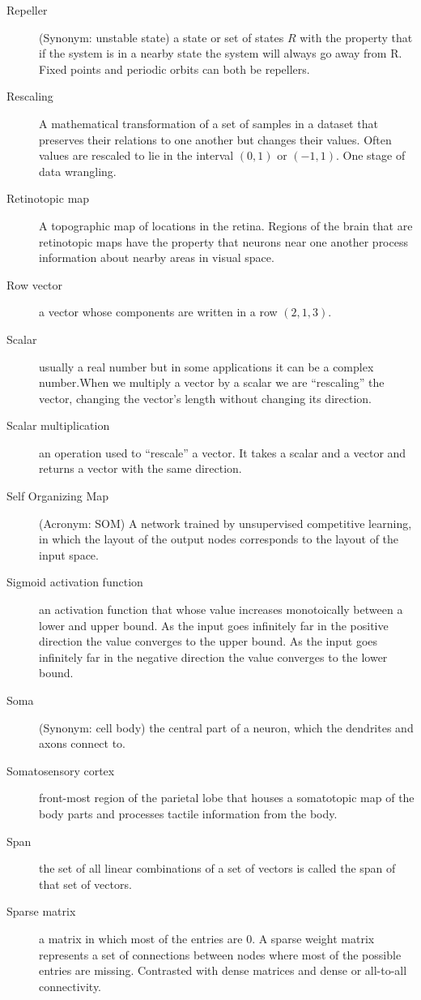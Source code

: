 \begin{description}
\item[Repeller] (Synonym: unstable state) a state or set of states $R$ with the property that if the system is in a nearby state the system will always go away from R. Fixed points and periodic orbits can both be repellers.
\item[Rescaling] A mathematical transformation of a set of samples in a dataset that preserves their relations to one another but changes their values. Often values are rescaled to lie in the interval $(0,1)$ or $(-1,1)$. One stage of data wrangling.
\item[Retinotopic map] A topographic map of locations in the retina. Regions of the brain that are retinotopic maps have the property that neurons near one another process information about nearby areas in visual space.
\item[Row vector] a vector whose components are written in a row \eg $(2,1,3)$.
\item[Scalar] usually a real number but in some applications it can be a complex number.When we multiply a vector by a scalar we are ``rescaling'' the vector, \ie changing the vector's length without changing its direction.
\item[Scalar multiplication] an operation used to ``rescale'' a vector. It takes a scalar and a vector and returns a vector with the same direction.
\item[Self Organizing Map] (Acronym: SOM)  A network trained by unsupervised competitive learning, in which the layout of the output nodes corresponds to the layout of the input space.
\item[Sigmoid activation function] an activation function that whose value increases monotoically between a lower and upper bound. As the input goes infinitely far in the positive direction the value converges to the upper bound. As the input goes infinitely far in the negative direction the value converges to the lower bound.
\item[Soma] (Synonym: cell body) the central part of a neuron, which the dendrites and axons connect to.
\item[Somatosensory cortex] front-most region of the parietal lobe that houses a somatotopic map of the body parts and processes tactile information from the body.
\item[Span] the set of all linear combinations of a set of vectors is called the span of that set of vectors.
\item[Sparse matrix] a matrix in which most of the entries are 0. A sparse weight matrix represents a set of connections between nodes where most of the possible entries are missing. Contrasted with dense matrices and dense or all-to-all connectivity. 

\end{description}
